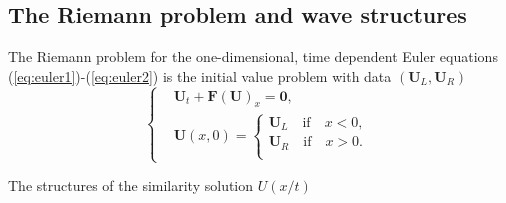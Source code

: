 \documentclass[review]{elsarticle}
\begin{document}
\subsection{The Riemann problem and wave structures }
The Riemann problem for the one-dimensional, time dependent Euler equations (\ref{eq:euler1})-(\ref{eq:euler2})  is the initial value problem with data $(\mathbf{U}_L, \mathbf{U}_R)$
\begin{equation}
  \left\{ \begin{aligned}
 & \mathbf{U}_t +\mathbf{F}(\mathbf{U})_x = \mathbf{0},\\
 & \mathbf{U}(x,0) = \left\{ \begin{aligned} 
	  \mathbf{U}_L \quad \text{if} \quad  x<0, \\
	  \mathbf{U}_R \quad \text{if} \quad  x>0. \\
  \end{aligned}\right.
\end{aligned}\right.
\end{equation}

The structures of the similarity solution $U(x/t)$ 








  \appendix
  \renewcommand{\appendixname}{Appendix~}
\end{document}
